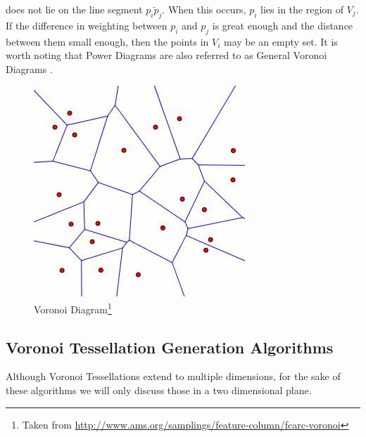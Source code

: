 %
does not lie on the line segment $\bar{p_ip_j}$. When this occurs, $p_i$ lies in the region of $V_j$. If the difference in weighting between $p_i$ and $p_j$ is great enough and the distance between them small enough, then the points in $V_i$ may be an empty set. It is worth noting that Power Diagrams are also referred to as General Voronoi Diagrams \citep{aurenhammer1987power}.
%
%
\begin{figure}[H]
    \centering
    \includegraphics[scale=0.65]{Images/voronoi.jpg}
    \caption[]{Voronoi Diagram\footnote{Taken from \url{http://www.ams.org/samplings/feature-column/fcarc-voronoi}}}
    \label{tes:fig:voreg}
\end{figure}
\subsection{Voronoi Tessellation Generation Algorithms}\label{tes:sec:tga}
Although Voronoi Tessellations extend to multiple dimensions, for the sake of these algorithms we will only discuss those in a two dimensional plane.
%
